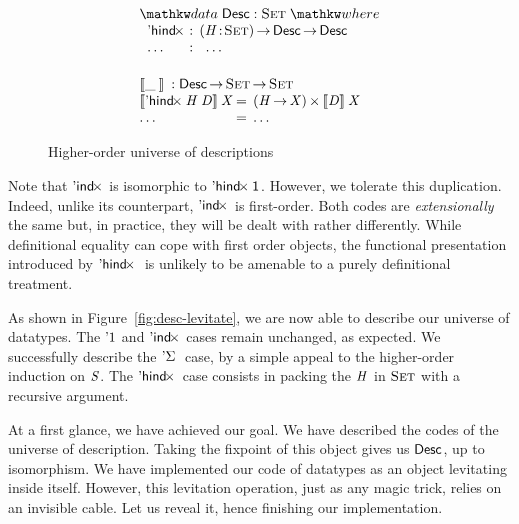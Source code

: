 \begin{figure}

\[\stk{
\begin{array}{ll}
\stk{
\data \Desc : \Set \where \\
\;\;\begin{array}{@{}l@{\::\:\:}l@{\quad}l}
    \DHindx{\!}{\!} & \PI{\V{H}}{\Set} \Desc \To \Desc \\
    \ldots          & \:\:\ldots
\end{array}
}
\vspace{0.2in}
\\
\stk{
\descop{\_\:}{} : \Desc \To \Set \To \Set \\
\begin{array}{@{}l@{\:=\:\:}ll}
\descop{\DHindx{\V{H}}{\V{D}}}{\V{X}}     &  \TIMES{(\V{H} \To \V{X})}{\descop{\V{D}}{\V{X}}} \\
\ldots                                    &  \ldots 
\end{array}
}
\end{array}
}\]

\caption{Higher-order universe of descriptions}
\label{fig:hindx_desc}

\end{figure}


Note that $\DIndx{\!}$ is isomorphic to $\DHindx{\Unit}{\!}$. However,
we tolerate this duplication. Indeed, unlike its counterpart,
$\DIndx{\!}$ is first-order. Both codes are \emph{extensionally} the
same but, in practice, they will be dealt with rather
differently. While definitional equality can cope with first order
objects, the functional presentation introduced by $\DHindx{\!}{}$ is
unlikely to be amenable to a purely definitional treatment.

As shown in Figure~\ref{fig:desc-levitate}, we are now able to
describe our universe of datatypes.  The $\DUnit$ and $\DIndx{\!}$
cases remain unchanged, as expected. We successfully describe the
$\DSigma{\!}{}$ case, by a simple appeal to the higher-order induction
on $\V{S}$. The $\DHindx{\!}{\!}$ case consists in packing the $\V{H}$
in $\Set$ with a recursive argument.

At a first glance, we have achieved our goal. We have described the
codes of the universe of description. Taking the fixpoint of this
object gives us $\Desc$, up to isomorphism. We have implemented our
code of datatypes as an object levitating inside itself. However,
this levitation operation, just as any magic trick, relies on an
invisible cable. Let us reveal it, hence finishing our implementation.


